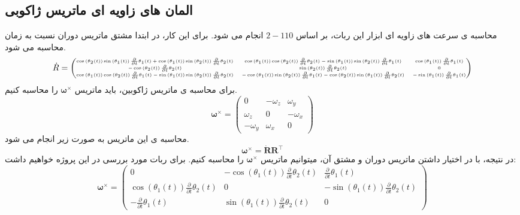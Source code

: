 \subsection*{المان های زاویه ای ماتریس ژاکوبی}
محاسبه ی سرعت های زاویه ای ابزار این ربات، بر اساس $2-110$ انجام می شود.
برای این کار، در ابتدا مشتق ماتریس دوران نسبت به زمان محاسبه می شود.
\[
\tiny
\dot{R} = 
\begin{pmatrix} 
	\cos\left(\theta_2(t)\right)\sin\left(\theta_1(t)\right)\frac{\partial}{\partial t}\theta_1(t) + \cos\left(\theta_1(t)\right)\sin\left(\theta_2(t)\right)\frac{\partial}{\partial t}\theta_2(t) & \cos\left(\theta_1(t)\right)\cos\left(\theta_2(t)\right)\frac{\partial}{\partial t}\theta_2(t) - \sin\left(\theta_1(t)\right)\sin\left(\theta_2(t)\right)\frac{\partial}{\partial t}\theta_1(t) & \cos\left(\theta_1(t)\right)\frac{\partial}{\partial t}\theta_1(t) \\
	-\cos\left(\theta_2(t)\right)\frac{\partial}{\partial t}\theta_2(t) & \sin\left(\theta_2(t)\right)\frac{\partial}{\partial t}\theta_2(t) & 0 \\
	\cos\left(\theta_1(t)\right)\cos\left(\theta_2(t)\right)\frac{\partial}{\partial t}\theta_1(t) - \sin\left(\theta_1(t)\right)\sin\left(\theta_2(t)\right)\frac{\partial}{\partial t}\theta_2(t) & -\cos\left(\theta_1(t)\right)\sin\left(\theta_2(t)\right)\frac{\partial}{\partial t}\theta_1(t) - \cos\left(\theta_2(t)\right)\sin\left(\theta_1(t)\right)\frac{\partial}{\partial t}\theta_2(t) & -\sin\left(\theta_1(t)\right)\frac{\partial}{\partial t}\theta_1(t)
\end{pmatrix}
\]
برای محاسبه ی ماتریس ژاکوبین، باید ماتریس $\boldsymbol{\omega}^\times$ را محاسبه کنیم.
\[
\boldsymbol{\omega}^\times = 
\begin{pmatrix}
	0 & -\omega_z & \omega_y \\
	\omega_z & 0 & -\omega_x \\
	-\omega_y & \omega_x & 0
\end{pmatrix}
\]
محاسبه ی این ماتریس به صورت زیر انجام می شود.
\[
\boldsymbol{\omega}^\times = \dot{\mathbf{R}} \mathbf{R}^\top
\]
در نتیجه، با در اختیار داشتن ماتریس دوران و مشتق آن، میتوانیم ماتریس $\boldsymbol{\omega}^\times$  را محاسبه کنیم. برای ربات مورد بررسی در این پروژه خواهیم داشت:
\[
\boldsymbol{\omega}^\times = 
\begin{pmatrix}
	0 & -\cos\left(\theta_1(t)\right)\frac{\partial}{\partial t}\theta_2(t) & \frac{\partial}{\partial t}\theta_1(t) \\
	\cos\left(\theta_1(t)\right)\frac{\partial}{\partial t}\theta_2(t) & 0 & -\sin\left(\theta_1(t)\right)\frac{\partial}{\partial t}\theta_2(t) \\
	-\frac{\partial}{\partial t}\theta_1(t) & \sin\left(\theta_1(t)\right)\frac{\partial}{\partial t}\theta_2(t) & 0
\end{pmatrix}
\]
